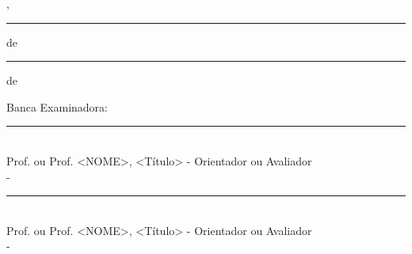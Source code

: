 \clearpage
\addtocounter{page}{2}
\thispagestyle{empty}
\covertitle{\autor}
\vspace{1mm}
\covertitle{\titulo}
\vspace{10mm}
\noindent
\begin{flushright}
  \vspace{.8cm}
  \hspace{.50\textwidth}
    \begin{minipage}{.48\textwidth}
        {\comentario}\par
    \end{minipage}
\end{flushright}
\vspace{1.0 cm}
\begin{center}
\local, \rule{1cm}{.3mm} de \rule{4cm}{.3mm} de \data
\end{center}
Banca Examinadora:
\begin{center}
\rule{11cm}{.3mm} \\
  Prof. ou Prof\textordfeminine. <NOME>, <Título> - Orientador ou Avaliador \\
  \siglainstituicao - \instituicao\\
  \vspace{10mm}
\rule{11cm}{.3mm} \\
  Prof. ou Prof\textordfeminine. <NOME>, <Título> - Orientador ou Avaliador \\
  \siglainstituicao - \instituicao\\
  \vspace{6mm}
\vspace{6mm}
\end{center}
